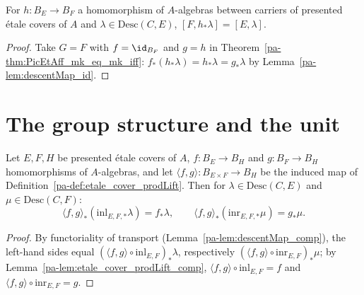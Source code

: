 \begin{lemma}
  \label{pa-lem:PicEtAff_mk_descentMap}
  \leanok

  For \(h \colon B_E \to B_F\) a homomorphism of \(A\)-algebras between carriers of presented
  \'etale covers of \(A\) and \(\lambda \in \mathrm{Desc}(C,E)\), \([F, h_{*}\lambda] =
  [E,\lambda]\).
\end{lemma}
\begin{proof}
  \leanok
  Take \(G = F\) with \(f = \id_{B_F}\) and \(g = h\) in Theorem~\ref{pa-thm:PicEtAff_mk_eq_mk_iff}:
  \(f_{*}(h_{*}\lambda) = h_{*}\lambda = g_{*}\lambda\) by Lemma~\ref{pa-lem:descentMap_id}.
\end{proof}

\section{The group structure and the unit}

\begin{lemma}
  \label{pa-lem:PicEtAff_descentMap_prodLift}
  \leanok

  Let \(E, F, H\) be presented \'etale covers of \(A\), \(f \colon B_E \to B_H\) and
  \(g \colon B_F \to B_H\) homomorphisms of \(A\)-algebras, and let
  \(\langle f,g\rangle \colon B_{E \times F} \to B_H\) be the induced map of
  Definition~\ref{pa-def:etale_cover_prodLift}. Then for \(\lambda \in \mathrm{Desc}(C,E)\) and
  \(\mu \in \mathrm{Desc}(C,F)\):
  \[
    \langle f,g\rangle_{*}(\mathrm{inl}_{E,F,*}\lambda) = f_{*}\lambda, \qquad
    \langle f,g\rangle_{*}(\mathrm{inr}_{E,F,*}\mu) = g_{*}\mu.
  \]
\end{lemma}
\begin{proof}
  \leanok
  By functoriality of transport (Lemma~\ref{pa-lem:descentMap_comp}), the left-hand sides equal
  \((\langle f,g\rangle \circ \mathrm{inl}_{E,F})_{*}\lambda\), respectively
  \((\langle f,g\rangle \circ \mathrm{inr}_{E,F})_{*}\mu\); by
  Lemma~\ref{pa-lem:etale_cover_prodLift_comp}, \(\langle f,g\rangle \circ \mathrm{inl}_{E,F} = f\)
  and \(\langle f,g\rangle \circ \mathrm{inr}_{E,F} = g\).
\end{proof}

